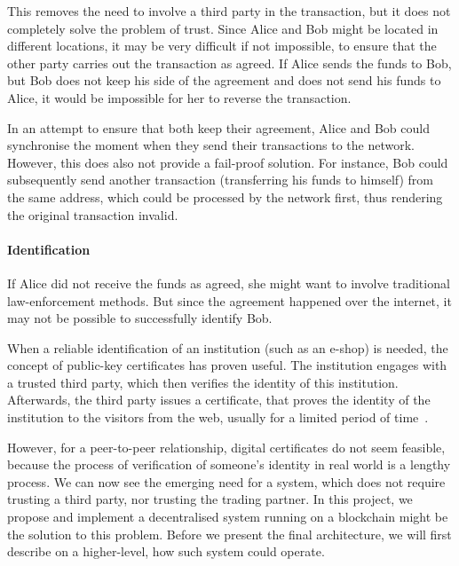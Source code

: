 This removes the need to involve a third party in the transaction, but it does not completely solve the problem of trust. Since Alice and Bob might be located in different locations, it may be very difficult if not impossible, to ensure that the other party carries out the transaction as agreed. If Alice sends the funds to Bob, but Bob does not keep his side of the agreement and does not send his funds to Alice, it would be impossible for her to reverse the transaction. 

In an attempt to ensure that both keep their agreement, Alice and Bob could synchronise the moment when they send their transactions to the network. However, this does also not provide a fail-proof solution. For instance, Bob could subsequently send another transaction (transferring his funds to himself) from the same address, which could be processed by the network first, thus rendering the original transaction invalid.

\paragraph{Identification} 
If Alice did not receive the funds as agreed, she might want to involve traditional law-enforcement methods. But since the agreement happened over the internet, it may not be possible to successfully identify Bob.

When a reliable identification of an institution (such as an e-shop) is needed, the concept of public-key certificates has proven useful. The institution engages with a trusted third party, which then verifies the identity of this institution. Afterwards, the third party issues a certificate, that proves the identity of the institution to the visitors from the web, usually for a limited period of time~\cite{Lee2013SecurityArchitects}. 

However, for a peer-to-peer relationship, digital certificates do not seem feasible, because the process of verification of someone's identity in real world is a lengthy process. We can now see the emerging need for a system, which does not require trusting a third party, nor trusting the trading partner. In this project, we propose and implement a decentralised system running on a blockchain might be the solution to this problem. Before we present the final architecture, we will first describe on a higher-level, how such system could operate.

